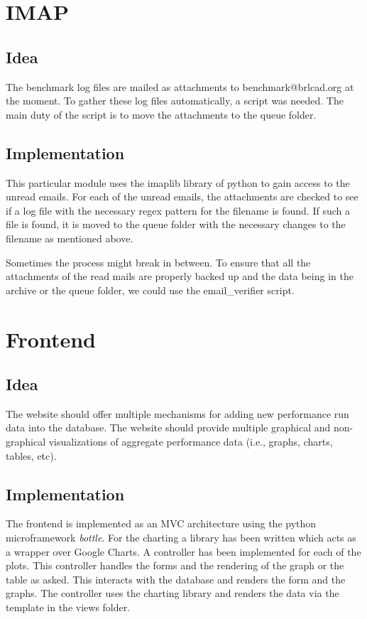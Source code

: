 \documentclass[a4paper,12pt, titlepage]{article}
\begin{document}
\section{IMAP}
\subsection{Idea}
The benchmark log files are mailed as attachments to benchmark@brlcad.org at the moment. To gather these log files automatically, a script was needed. The main duty of the script is to move the attachments to the queue folder.

\subsection{Implementation}
This particular module uses the imaplib library of python to gain access to the unread emails. For each of the unread emails, the attachments are checked to see if a log file with the necessary regex pattern for the filename is found. If such a file is found, it is moved to the queue folder with the necessary changes to the filename as mentioned above.

Sometimes the process might break in between. To ensure that all the attachments of the read mails are properly backed up and the data being in the archive or the queue folder, we could use the email\_verifier script.

\section{Frontend}
\subsection{Idea}
The website should offer multiple mechanisms for adding new performance run data into the database. The website should provide multiple graphical and non-graphical visualizations of aggregate performance data (i.e., graphs, charts, tables, etc). 

\subsection{Implementation}
The frontend is implemented as an MVC architecture using the python microframework \emph{bottle}. For the charting a library has been written which acts as a wrapper over Google Charts. A controller has been implemented for each of the plots. This controller handles the forms and the rendering of the graph or the table as asked. This interacts with the database and renders the form and the graphs. The controller uses the charting library and renders the data via the template in the views folder.
\end{document}
